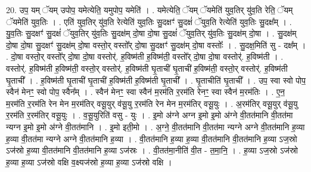 \documentclass[17pt]{extarticle}
\begin{document}
20. उप॒ यम् ॅयम् उपोप॒ यमेत्येति॒ यमुपोप॒ यमेति॑ । . यमेत्येति॒ ॅयम् ॅयमेति॑ युव॒तिर् यु॑व॒ति रेति॒ ॅयम् ॅयमेति॑ युव॒तिः । . एति॑ युव॒तिर् यु॑व॒ति रेत्येति॑ युव॒तिः सु॒दक्षꣳ॑ सु॒दक्षं॑ ॅयुव॒ति रेत्येति॑ 
युव॒तिः सु॒दक्ष᳚म् । . यु॒व॒तिः सु॒दक्षꣳ॑ सु॒दक्षं॑ ॅयुव॒तिर् यु॑व॒तिः सु॒दक्ष॑म् दो॒षा दो॒षा सु॒दक्षं॑ ॅयुव॒तिर् यु॑व॒तिः सु॒दक्ष॑म् दो॒षा । . सु॒दक्ष॑म् दो॒षा दो॒षा सु॒दक्षꣳ॑ सु॒दक्ष॑म् दो॒षा वस्तो॒र् वस्तो᳚र् दो॒षा सु॒दक्षꣳ॑ सु॒दक्ष॑म् दो॒षा वस्तोः᳚ । . सु॒दक्ष॒मिति॑ सु - दक्ष᳚म् । . दो॒षा वस्तो॒र् वस्तो᳚र् दो॒षा दो॒षा वस्तोर्॑. ह॒विष्म॑ती ह॒विष्म॑ती॒ वस्तो᳚र् दो॒षा दो॒षा वस्तोर्॑. ह॒विष्म॑ती । . वस्तोर्॑. ह॒विष्म॑ती ह॒विष्म॑ती॒ वस्तो॒र् वस्तोर्॑. ह॒विष्म॑ती घृ॒ताची॑ घृ॒ताची॑ ह॒विष्म॑ती॒ वस्तो॒र् वस्तोर्॑. ह॒विष्म॑ती घृ॒ताची᳚ । . ह॒विष्म॑ती घृ॒ताची॑ घृ॒ताची॑ ह॒विष्म॑ती ह॒विष्म॑ती घृ॒ताची᳚ । . घृ॒ताचीति॑ घृ॒ताची᳚ । . उप॒ स्वा स्वो पोप॒ स्वैन॑ मेनꣳ॒॒ स्वो पोप॒ स्वैन᳚म् । . स्वैन॑ मेनꣳ॒॒ स्वा स्वैन॑ म॒रम॑ति र॒रम॑ति रेनꣳ॒॒ स्वा स्वैन॑ म॒रम॑तिः । . ए॒न॒ म॒रम॑ति र॒रम॑ति रेन मेन म॒रम॑तिर् वसू॒युर् व॑सू॒यु र॒रम॑ति रेन मेन म॒रम॑तिर् वसू॒युः । . अ॒रम॑तिर् वसू॒युर् व॑सू॒यु र॒रम॑ति र॒रम॑तिर् वसू॒युः । . व॒सू॒युरिति॑ वसु - युः । . इ॒मो अ॑ग्ने अग्न इ॒मो इ॒मो अ॑ग्ने वी॒तत॑मानि वी॒तत॑मा न्यग्न इ॒मो इ॒मो अ॑ग्ने वी॒तत॑मानि । . इ॒मो इती॒मो । . अ॒ग्ने॒ वी॒तत॑मानि वी॒तत॑मा न्यग्ने अग्ने वी॒तत॑मानि ह॒व्या ह॒व्या वी॒तत॑मा न्यग्ने अग्ने वी॒तत॑मानि ह॒व्या । . वी॒तत॑मानि ह॒व्या ह॒व्या वी॒तत॑मानि वी॒तत॑मानि ह॒व्या ऽज॒स्रो ऽज॑स्रो ह॒व्या वी॒तत॑मानि वी॒तत॑मानि ह॒व्या ऽज॑स्रः । . वी॒तत॑मा॒नीति॑ वी॒त - त॒मा॒नि॒ । . ह॒व्या ऽज॒स्रो ऽज॑स्रो ह॒व्या ह॒व्या ऽज॑स्रो वक्षि व॒क्ष्यज॑स्रो ह॒व्या ह॒व्या ऽज॑स्रो वक्षि । \newline
\end{document}
